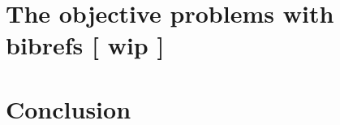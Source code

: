 \documentclass[twoside,11pt,openright,a4paper]{report}
\newcommand{\remark}[1]{{ \bf [ \footnotesize #1 ]}}
\begin{document}


\chapter{The objective problems with bibrefs \remark{wip}}
\label{ch:problem-description}





\chapter{Conclusion}
\label{ch:conclusion}

\todo{\dots}


\printbibliography
\end{document}
